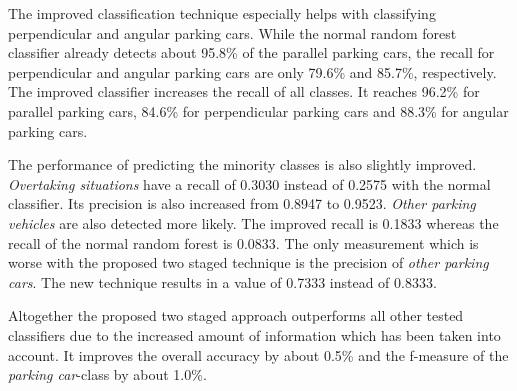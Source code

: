The improved classification technique especially helps with classifying perpendicular and angular parking cars. While the normal random forest classifier already detects about 95.8\% of the parallel parking cars, the recall for perpendicular and angular parking cars are only 79.6\% and 85.7\%, respectively. The improved classifier increases the recall of all classes. It reaches 96.2\% for parallel parking cars, 84.6\% for perpendicular parking cars and 88.3\% for angular parking cars. 

The performance of predicting the minority classes is also slightly improved. \emph{Overtaking situations} have a recall of 0.3030 instead of 0.2575 with the normal classifier. Its precision is also increased from 0.8947 to 0.9523. \emph{Other parking vehicles} are also detected more likely. The improved recall is 0.1833 whereas the recall of the normal random forest is 0.0833. The only measurement which is worse with the proposed two staged technique is the precision of \emph{other parking cars}. The new technique results in a value of 0.7333 instead of 0.8333.

Altogether the proposed two staged approach outperforms all other tested classifiers due to the increased amount of information which has been taken into account. It improves the overall accuracy by about 0.5\% and the f-measure of the \emph{parking car}-class by about 1.0\%. 










\begin{table}


\caption{Confusion Matrix of the best found configuration of the proposed two staged classification technique (two random forests and using 10 surrounding samples).}
\label{table:surrounding_classifier_confusion_matrix}
\end{table}

